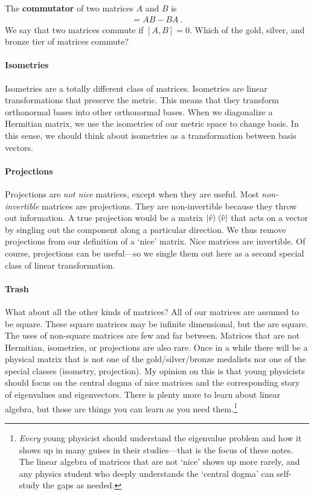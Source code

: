 \documentclass[12pt]{article}
\begin{document}
\begin{exercise}
The \textbf{commutator} of two matrices $A$ and $B$ is
\begin{align}
    [A,B] = AB - BA \ .
\end{align}
We say that two matrices commute if $[A,B]=0$.
Which of the gold, silver, and bronze tier of matrices commute? 
\end{exercise}

\paragraph{Isometries} Isometries are a totally different class of matrices. Isometries are linear transformations that preserve the metric. This means that they transform orthonormal bases into other orthonormal bases. When we diagonalize a Hermitian matrix, we use the isometries of our metric space to change basis. In this sense, we should think about isometries as a transformation between basis vectors. 

\paragraph{Projections} Projections are \emph{not nice} matrices, except when they are useful. Most \emph{non-invertible} matrices are projections. They are non-invertible because they throw out information. A true projection would be a matrix $\left|\hat{v}\right\rangle\left\langle\hat{v}\right|$ that acts on a vector by singling out the component along a particular direction. We thus remove projections from our definition of a `nice' matrix. Nice matrices are invertible. Of course, projections can be useful---so we single them out here as a second special class of linear transformation.

\paragraph{Trash} What about all the other kinds of matrices? All of our matrices are assumed to be square. These square matrices may be infinite dimensional, but the are square. The uses of non-square matrices are few and far between. Matrices that are not Hermitian, isometries, or projections are also rare. Once in a while there will be a physical matrix that is not one of the gold/silver/bronze medalists nor one of the special classes (isometry, projection). My opinion on this is that young physicists should focus on the central dogma of nice matrices and the corresponding story of eigenvalues and eigenvectors. There is plenty more to learn about linear algebra, but those are things you can learn as you need them.\footnote{\emph{Every} young physicist should understand the eigenvalue problem and how it shows up in many guises in their studies---that is the focus of these notes. The linear algebra of matrices that are not `nice' shows up more rarely, and any physics student who deeply understands the `central dogma' can self-study the gaps as needed.}
\end{document}
